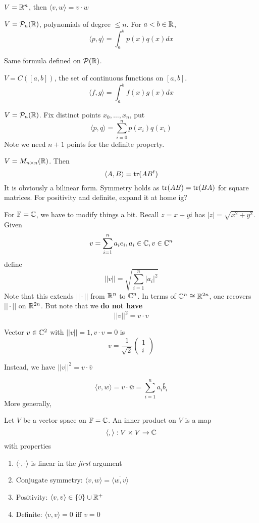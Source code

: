 \documentclass[12pt]{article}
\begin{document}
\begin{ex}
	$V=\mathbb{R}^n$, then $\langle v,w \rangle = v \cdot w$
\end{ex}

\begin{ex}
	$V = \mathcal{P}_n(\mathbb{R})$, polynomials of degree $\leq n$. For $a<b\in\mathbb{R}$,
	$$\langle p, q\rangle = \int_a^b p(x)q(x)dx$$
\end{ex}

Same formula defined on $\mathcal{P}(\mathbb{R})$.

\begin{ex}
	$V = C([a,b])$, the set of continuous functions on $[a,b]$.
	$$\langle f,g \rangle = \int_a^b f(x)g(x)dx$$
\end{ex}

\begin{ex}
	$V = \mathcal{P}_n(\mathbb{R})$. Fix distinct points $x_0,\dots,x_n$, put
	$$\langle p,q \rangle = \sum_{i=0}^n p(x_i)q(x_i)$$
	Note we need $n+1$ points for the definite property.
\end{ex}

\begin{ex}
	$V=M_{n\times n}(\mathbb{R})$. Then
	$$\langle A,B \rangle = \operatorname{tr}(AB^t)$$
	It is obviously a bilinear form. Symmetry holds as $\operatorname{tr}(AB) = \operatorname{tr}(BA)$ for square matrices. For positivity and definite, expand it at home ig?
\end{ex}

For $\mathbb{F}=\mathbb{C}$, we have to modify things a bit. Recall $z=x+yi$ has $|z| = \sqrt{x^2+y^2}$. Given
$$v=\sum_{i=1}^n a_ie_i,a_i\in\mathbb{C},v\in\mathbb{C}^n$$
define
$$||v|| = \sqrt{\sum_{i=1}^n |a_i|^2}$$
Note that this extends $||\cdot||$ from $\mathbb{R}^n$ to $\mathbb{C}^n$. In terms of $\mathbb{C}^n\cong\mathbb{R}^{2n}$, one recovers $||\cdot||$ on $\mathbb{R}^{2n}$. But note that we \textbf{do not have}
$$||v||^2 = v\cdot v$$

\begin{ex}
	Vector $v\in\mathbb{C}^2$ with $||v||=1, v \cdot v = 0$ is
	$$v = \frac{1}{\sqrt{2}} \begin{pmatrix} 1 \\ i \end{pmatrix}$$
\end{ex}

Instead, we have $||v||^2 = v \cdot \bar{v}$

$$\langle v,w \rangle = v\cdot\bar{w} = \sum_{i=1}^n a_i\bar{b}_i$$
More generally,
\begin{defn}
	Let $V$ be a vector space on $\mathbb{F} = \mathbb{C}$. An inner product on $V$ is a map
	$$\langle,\rangle: V \times V \rightarrow \mathbb{C}$$
	with properties
	\begin{enumerate}
		\item $\langle \cdot,\cdot \rangle$ is linear in the \emph{first} argument
		\item Conjugate symmetry: $\langle v,w \rangle = \overline{\langle w,v \rangle}$
		\item Positivity: $\langle v,v \rangle \in \{0\}\cup\mathbb{R}^+$
		\item Definite: $\langle v,v \rangle = 0$ iff $v=0$
	\end{enumerate}
\end{defn}
\end{document}
